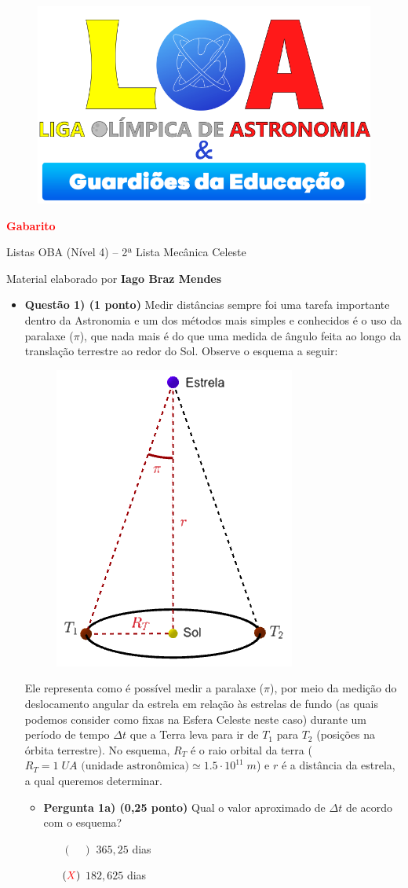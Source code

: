 \documentclass[a4paper, 12pt]{article}
\newcommand{\cabecalho}[4]
{
	\begin{figure}
		\centering
		\href{https://ligaolimpicadeastronomia.com.br/}{\includegraphics[scale=0.6]{./img/logos.png}}
	\end{figure}
	
	\begin{center}
		\begin{large}
			\textbf{#1}	
		\end{large}
			\linebreak Listas OBA (Nível 4) -- #2ª Lista
			\linebreak #3
		\end{center}
	
	\begin{flushright}
		Material elaborado por \textbf{#4}
	\end{flushright}
}
\begin{document}
	\cabecalho{\textcolor{red}{Gabarito}}{2}{Mecânica Celeste}{Iago Braz Mendes}
	
	\begin{flushleft}
	\begin{itemize}
		\item \textbf{Questão 1) (1 ponto)} Medir distâncias sempre foi uma tarefa importante dentro da Astronomia e um dos métodos mais simples e conhecidos é o uso da paralaxe ($\pi$), que nada mais é do que uma medida de ângulo feita ao longo da translação terrestre ao redor do Sol. Observe o esquema a seguir:
			\begin{figure}[H]
				\centering
				\includegraphics[scale=0.8]{./img/1.png}
			\end{figure}
			Ele representa como é possível medir a paralaxe ($\pi$), por meio da medição do deslocamento angular da estrela em relação às estrelas de fundo (as quais podemos consider como fixas na Esfera Celeste neste caso) durante um período de tempo $\Delta t$ que a Terra leva para ir de $T_1$ para $T_2$ (posições na órbita terrestre). No esquema, $R_T$ é o raio orbital da terra ($R_T = 1 \; UA \textrm{ (unidade astronômica)} \simeq 1.5 \cdot 10^{11} \; m$) e $r$ é a distância da estrela, a qual queremos determinar.
			\begin{itemize}
				\item \textbf{Pergunta 1a) (0,25 ponto)} Qual o valor aproximado de $\Delta t$ de acordo com o esquema?
					\begin{itemize}
						\item[$(\quad)$] $365,25$ dias
						\item[$(\textcolor{red}{X})$] $182,625$ dias

\end{itemize}
\end{itemize}
\end{itemize}
\end{flushleft}
\end{document}
